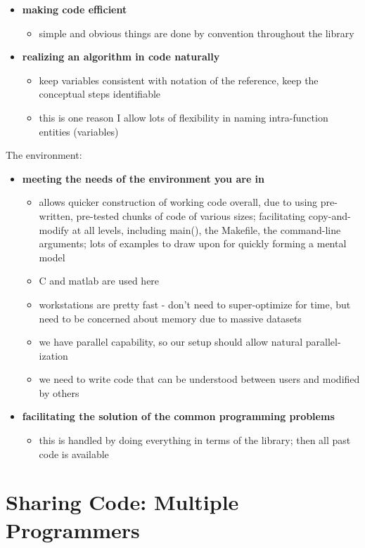 \begin{itemize}
\item {\bf making code efficient}
	\begin{itemize}
	\item simple and obvious things are done by convention throughout the library
	\end{itemize}
\item {\bf realizing an algorithm in code naturally}
	\begin{itemize}
	\item keep variables consistent with notation of the reference, keep the
			conceptual steps identifiable
	\item this is one reason I allow lots of flexibility in naming intra-function
			entities (variables)
	\end{itemize}
\end{itemize}

	The environment:
\begin{itemize}
\item {\bf meeting the needs of the environment you are in}
	\begin{itemize}
	\item allows quicker construction of working code overall, due to
			using pre-written, pre-tested chunks of code of various sizes;
			facilitating copy-and-modify at all levels, including main(), the
				Makefile, the command-line arguments;
			lots of examples to draw upon for quickly forming a mental model
	\item C and matlab are used here
	\item workstations are pretty fast - don't need to super-optimize for time, 
			but need to be concerned about memory due to massive datasets
	\item we have parallel capability, so our setup should allow natural parallel-
			ization
	\item we need to write code that can be understood between users and 
			modified by others
	\end{itemize}
\item {\bf facilitating the solution of the common programming problems}
	\begin{itemize}
	\item this is handled by doing everything in terms of the library; then all
			past code is available
	\end{itemize}
\end{itemize}

\pagebreak
\part{Sharing Code:  Multiple Programmers}

